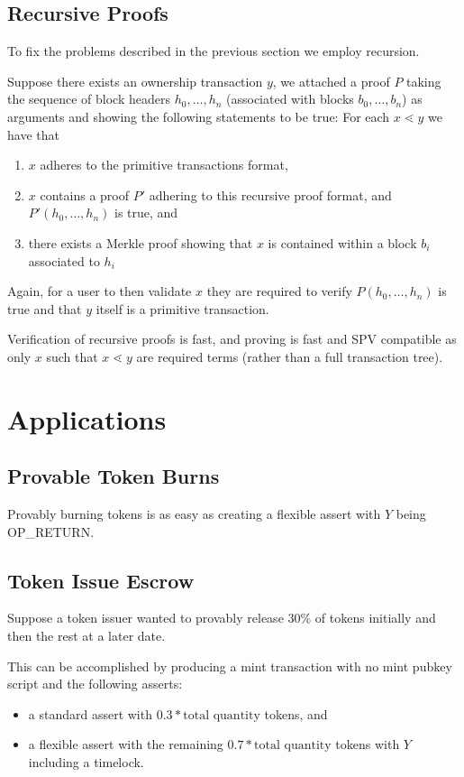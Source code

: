 \documentclass[9pt,oneside]{amsart}
\begin{document}
\begin{multicols}{2}
\subsection{Recursive Proofs}
To fix the problems described in the previous section we employ recursion. 

Suppose there exists an ownership transaction $y$, we attached a proof $P$ taking the sequence of block headers $h_{0}, \dots, h_{n}$ (associated with blocks $b_{0}, \dots, b_{n}$) as arguments and showing the following statements to be true:
For each $x \lessdot y$ we have that
\begin{enumerate}
    \item $x$ adheres to the primitive transactions format,
    \item $x$ contains a proof $P'$ adhering to this recursive proof format, and $P'(h_{0}, \dots, h_{n})$ is true, and
    \item there exists a Merkle proof showing that $x$ is contained within a block $b_{i}$ associated to $h_{i}$
\end{enumerate}

Again, for a user to then validate $x$ they are required to verify $P(h_{0}, \dots, h_{n})$ is true and that $y$ itself is a primitive transaction.

Verification of recursive proofs is fast, and proving is fast and SPV compatible as only $x$ such that $x \lessdot y$ are required terms (rather than a full transaction tree).

\section{Applications}
\subsection{Provable Token Burns}
Provably burning tokens is as easy as creating a flexible assert with $Y$ being OP\_RETURN.
\subsection{Token Issue Escrow}
Suppose a token issuer wanted to provably release 30\% of tokens initially and then the rest at a later date.

This can be accomplished by producing a mint transaction with no mint pubkey script and the following asserts:
\begin{itemize}
    \item a standard assert with $0.3*\text{total quantity}$ tokens, and
    \item a flexible assert with the remaining $0.7*\text{total quantity}$ tokens with $Y$ including a timelock.
\end{itemize}


\end{multicols}
\end{document}
